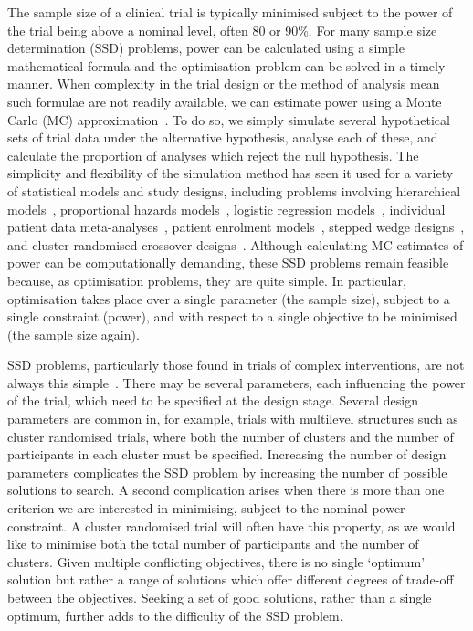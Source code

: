 \documentclass{article}
\begin{document}
The sample size of a clinical trial is typically minimised subject to the power of the trial being above a nominal level, often 80 or 90\%. For many sample size determination (SSD) problems, power can be calculated using a simple mathematical formula and the optimisation problem can be solved in a timely manner. When complexity in the trial design or the method of analysis mean such formulae are not readily available, we can estimate power using a Monte Carlo (MC) approximation~\cite{Arnold2011, Landau2013}. To do so, we simply simulate several hypothetical sets of trial data under the alternative hypothesis, analyse each of these, and calculate the proportion of analyses which reject the null hypothesis. The simplicity and flexibility of the simulation method has seen it used for a variety of statistical models and study designs, including problems involving hierarchical models~\cite{Feng1992, Hooper2013}, proportional hazards models~\cite{Schoenfeld2005}, logistic regression models~\cite{Grieve2016}, individual patient data meta-analyses~\cite{Sutton2007, Kontopantelis2016}, patient enrolment models~\cite{Fedorov2005}, stepped wedge designs~\cite{Baio2015, Hooper2016}, and cluster randomised crossover designs~\cite{Reich2012}. Although calculating MC estimates of power can be computationally demanding, these SSD problems remain feasible because, as optimisation problems, they are quite simple. In particular, optimisation takes place over a single parameter (the sample size), subject to a single constraint (power), and with respect to a single objective to be minimised (the sample size again).

SSD problems, particularly those found in trials of complex interventions, are not always this simple~\cite{Wilson2015}. There may be several parameters, each influencing the power of the trial, which need to be specified at the design stage. Several design parameters are common in, for example, trials with multilevel structures such as cluster randomised trials, where both the number of clusters and the number of participants in each cluster must be specified. Increasing the number of design parameters complicates the SSD problem by increasing the number of possible solutions to search. A second complication arises when there is more than one criterion we are interested in minimising, subject to the nominal power constraint. A cluster randomised trial will often have this property, as we would like to minimise both the total number of participants and the number of clusters. Given multiple conflicting objectives, there is no single `optimum' solution but rather a range of solutions which offer different degrees of trade-off between the objectives. Seeking a set of good solutions, rather than a single optimum, further adds to the difficulty of the SSD problem.
\end{document}
